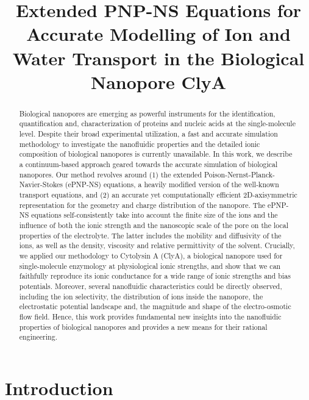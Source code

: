 \documentclass[journal=ancac3,manuscript=article,etalmode=truncate,maxauthors=0,layout=onecolumn]{achemso}
\title{Extended PNP-NS Equations for Accurate Modelling of Ion and Water Transport in the Biological Nanopore ClyA}
\begin{document}
\begin{tocentry}
\end{tocentry}



\begin{abstract}
  \footnotesize
  Biological nanopores are emerging as powerful instruments for the identification, quantification and,
  characterization of proteins and nucleic acids at the single-molecule level. Despite their broad
  experimental utilization, a fast and accurate simulation methodology to investigate the nanofluidic
  properties and the detailed ionic composition of biological nanopores is currently unavailable. In this
  work, we describe a continuum-based approach geared towards the accurate simulation of biological nanopores.
  Our method revolves around (1) the extended Poison-Nernst-Planck-Navier-Stokes (ePNP-NS) equations, a
  heavily modified version of the well-known transport equations, and (2) an accurate yet computationally
  efficient 2D-axisymmetric representation for the geometry and charge distribution of the nanopore. The
  ePNP-NS equations self-consistently take into account the finite size of the ions and the influence of both
  the ionic strength and the nanoscopic scale of the pore on the local properties of the electrolyte. The
  latter includes the mobility and diffusivity of the ions, as well as the density, viscosity and relative
  permittivity of the solvent. Crucially, we applied our methodology to Cytolysin A (ClyA), a biological
  nanopore used for single-molecule enzymology at physiological ionic strengths, and show that we can
  faithfully reproduce its ionic conductance for a wide range of ionic strengths and bias potentials.
  Moreover, several nanofluidic characteristics could be directly observed, including the ion selectivity, the
  distribution of ions inside the nanopore, the electrostatic potential landscape and, the magnitude and shape
  of the electro-osmotic flow field. Hence, this work provides fundamental new insights into the nanofluidic
  properties of biological nanopores and provides a new means for their rational engineering.
\end{abstract}



\section{Introduction}
\end{document}
